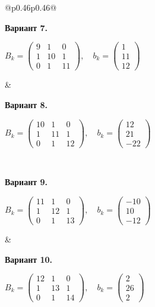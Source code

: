 \documentclass[12pt,a4paper]{article}
\begin{document}
{\begin{longtable}{@{}p{0.46\textwidth}p{0.46\textwidth}@{}}
\begin{minipage}[t]{\linewidth}
\textbf{Вариант 7.}\par\smallskip
\(\displaystyle B_k=\begin{pmatrix}9&1&0\\1&10&1\\0&1&11\end{pmatrix},\quad b_k=\begin{pmatrix}1\\11\\12\end{pmatrix}\)\par
\end{minipage} &
\begin{minipage}[t]{\linewidth}\vspace{0pt}\raggedright\setlength{\parskip}{0pt}
\textbf{Вариант 8.}\par\smallskip
\(\displaystyle B_k=\begin{pmatrix}10&1&0\\1&11&1\\0&1&12\end{pmatrix},\quad b_k=\begin{pmatrix}12\\21\\-22\end{pmatrix}\)\par
\end{minipage}\\\noalign{\vskip 14pt}
\begin{minipage}[t]{\linewidth}\vspace{0pt}\raggedright\setlength{\parskip}{0pt}
\textbf{Вариант 9.}\par\smallskip
\(\displaystyle B_k=\begin{pmatrix}11&1&0\\1&12&1\\0&1&13\end{pmatrix},\quad b_k=\begin{pmatrix}-10\\10\\-12\end{pmatrix}\)\par
\end{minipage} &
\begin{minipage}[t]{\linewidth}\vspace{0pt}\raggedright\setlength{\parskip}{0pt}
\textbf{Вариант 10.}\par\smallskip
\(\displaystyle B_k=\begin{pmatrix}12&1&0\\1&13&1\\0&1&14\end{pmatrix},\quad b_k=\begin{pmatrix}2\\26\\2\end{pmatrix}\)\par

\end{minipage}
\end{longtable}}
\end{document}
